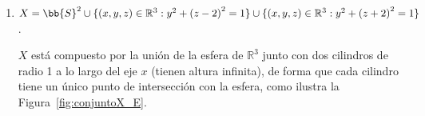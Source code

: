 \begin{ejercicio}
\begin{enumerate}[label=\alph*)]

        \item $X = \bb{S}^2\cup \{(x,y,z)\in \mathbb{R}^3 : y^2 + {(z-2)}^{2} = 1\}\cup \{(x,y,z)\in \mathbb{R}^3 : y^2 + {(z+2)}^{2}=1\}$.

            $X$ está compuesto por la unión de la esfera de $\mathbb{R}^3$ junto con dos cilindros de radio 1 a lo largo del eje $x$ (tienen altura infinita), de forma que cada cilindro tiene un único punto de intersección con la esfera, como ilustra la Figura~\ref{fig:conjuntoX_E}.
            \begin{figure}[h]
                \centering
                \begin{tikzpicture}[scale=0.8]


\end{tikzpicture}
\end{figure}
\end{enumerate}
\end{ejercicio}
